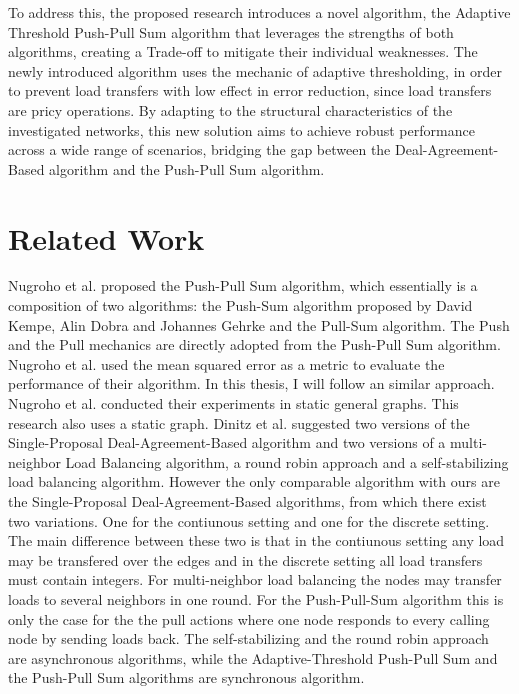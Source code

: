 To address this, the proposed research introduces a novel algorithm, the Adaptive Threshold Push-Pull Sum algorithm that leverages the strengths of both algorithms, creating a Trade-off to mitigate their individual weaknesses. The newly introduced algorithm uses the mechanic of adaptive thresholding, in order to prevent load transfers with low effect in error reduction, since load transfers are pricy operations. By adapting to the structural characteristics of the investigated networks, this new solution aims to achieve robust performance across a wide range of scenarios, bridging the gap between the Deal-Agreement-Based algorithm and the Push-Pull Sum algorithm.

\section{Related Work}\label{sec:relatedwork}
Nugroho et al. \cite{nugroho2023PushPullSumDataAg} proposed the Push-Pull Sum algorithm, which essentially is a composition of two algorithms: the Push-Sum algorithm proposed by David Kempe, Alin Dobra and Johannes Gehrke \cite{kempe2003gossipbasedComp} and the Pull-Sum algorithm. The Push and the Pull mechanics are directly adopted from the Push-Pull Sum algorithm. Nugroho et al. used the mean squared error as a metric to evaluate the performance of their algorithm. In this thesis, I will follow an similar approach. Nugroho et al. conducted their experiments in static general graphs. This research also uses a static graph.  
Dinitz et al. \cite{Dinitz2023DAB} suggested two versions of the Single-Proposal Deal-Agreement-Based algorithm and two versions of a multi-neighbor Load Balancing algorithm, a round robin approach and a self-stabilizing load balancing algorithm. However the only comparable algorithm with ours are the Single-Proposal Deal-Agreement-Based algorithms, from which there exist two variations. One for the contiunous setting and one for the discrete setting. The main difference between these two is that in the contiunous setting any load may be transfered over the edges and in the discrete setting all load transfers must contain integers. For multi-neighbor load balancing the nodes may transfer loads to several neighbors in one round. For the Push-Pull-Sum algorithm this is only the case for the the pull actions where one node responds to every calling node by sending loads back. The self-stabilizing and the round robin approach are asynchronous algorithms, while the Adaptive-Threshold Push-Pull Sum and the Push-Pull Sum algorithms are synchronous algorithm.

